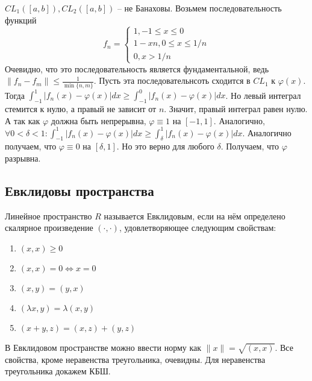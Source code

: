 \documentclass[document.tex]{subfiles}
\begin{document}
\begin{example}
    $CL_{1} ([a, b]), CL_{2} ([a, b])$ -- не Банаховы. Возьмем последовательность функций 
    \[
        f_n = 
        \begin{cases}
            1, -1 \leq x \leq 0 \\
            1 - xn, 0 \leq x \leq 1/n \\
            0, x > 1/n
        \end{cases}
    \]
    Очевидно, что это последовательность является фундаментальной, ведь $\|f_n - f_m\| \leq \frac{1}{\min \{n, m\}}$.
    Пусть эта последовательнсоть сходится в $CL_1$ к $\varphi(x)$. Тогда $\int_{-1}^{1}|f_n(x) - \varphi(x)|dx \geq
    \int_{-1}^{0}|f_n(x) - \varphi(x)|dx$. Но левый интеграл стемится к нулю, а правый не зависит от $n$. Значит, правый
    интеграл равен нулю. А так как $\varphi$ должна быть непрерывна, $\varphi \equiv 1$ на $[-1, 1]$. Аналогично,
    $\forall 0 < \delta < 1: \int_{-1}^{1}|f_n(x) - \varphi(x)|dx \geq \int_{\delta}^{1}|f_n(x) - \varphi(x)|dx$.
    Аналогично получаем, что $\varphi \equiv 0$ на $[\delta, 1]$. Но это верно для любого $\delta$. Получаем, что
    $\varphi$ разрывна.
\end{example}

\subsection{Евклидовы пространства}

\begin{definition}
    Линейное пространство $R$ называется Евклидовым, если на нём определено скалярное произведение $(\cdot, \cdot)$,
    удовлетворяющее следующим свойствам:
    \begin{enumerate}
        \item $(x, x) \geq 0$
        \item $(x, x) = 0 \Leftrightarrow x = 0$
        \item $(x, y) = (y, x)$
        \item $(\lambda x, y) = \lambda (x, y)$
        \item $(x + y, z) = (x, z) + (y, z)$
    \end{enumerate}
\end{definition}

\begin{remark}
    В Евклидовом пространстве можно ввести норму как $\|x\| = \sqrt{(x, x)}$. Все свойства, кроме неравенства
    треугольника, очевидны. Для неравенства треугольника докажем КБШ.
\end{remark}
\end{document}
